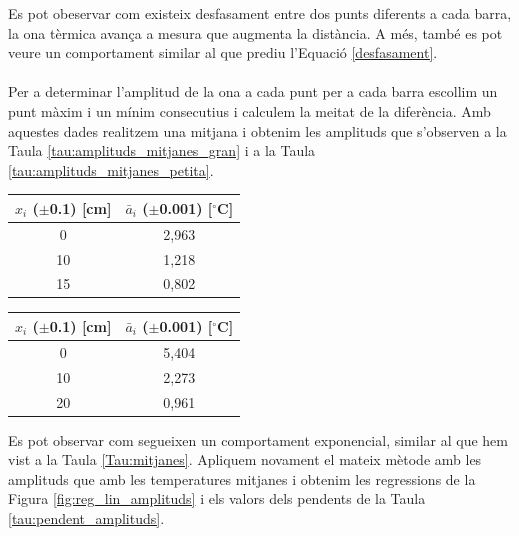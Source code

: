 \documentclass[12pt,twosides,onecolumn,openany]{article}
\newenvironment{Figura}
  {\par\medskip\noindent\minipage{\linewidth}}
  {\endminipage\par\medskip}
\begin{document}
\begin{multicols}{2}
\begin{Figura}
  \label{fig:T_vs_t_petita_norm}
\end{Figura}
Es pot obeservar com existeix desfasament entre dos punts diferents a cada barra, la ona tèrmica avança a mesura que augmenta la distància. A més, també es pot veure un comportament similar al que prediu l'Equació \eqref{desfasament}.\\\\
Per a determinar l'amplitud de la ona a cada punt per a cada barra escollim un punt màxim i un mínim consecutius i calculem la meitat de la diferència. Amb aquestes dades realitzem una mitjana i obtenim les amplituds que s'observen a la Taula \ref{tau:amplituds_mitjanes_gran} i a la Taula \ref{tau:amplituds_mitjanes_petita}.
\begin{Figura}
  \centering
  \begin{tabular}{c|c}
    $x_i$ ($\pm$0.1) [cm] & $\bar{a}_i$ ($\pm$0.001) [$^\circ$C]  \\ \hline
    0 & 2,963\\
    10 & 1,218\\
    15 & 0,802 
  \end{tabular}
  \label{tau:amplituds_mitjanes_gran}
\end{Figura} 
\begin{Figura}
  \centering
  \begin{tabular}{c|c}
    $x_i$ ($\pm$0.1) [cm] & $\bar{a}_i$ ($\pm$0.001) [$^\circ$C]  \\ \hline
    0 & 5,404\\
    10 & 2,273\\
    20 & 0,961  
  \end{tabular}
  \label{tau:amplituds_mitjanes_gran}
\end{Figura} 
Es pot observar com segueixen un comportament exponencial, similar al que hem vist a la Taula \ref{Tau:mitjanes}. Apliquem novament el mateix mètode amb les amplituds que amb les temperatures mitjanes i obtenim les regressions de la Figura \ref{fig:reg_lin_amplituds} i els valors dels pendents de la Taula \ref{tau:pendent_amplituds}.
\begin{Figura}
  \centering

\end{Figura}
\end{multicols}
\end{document}
